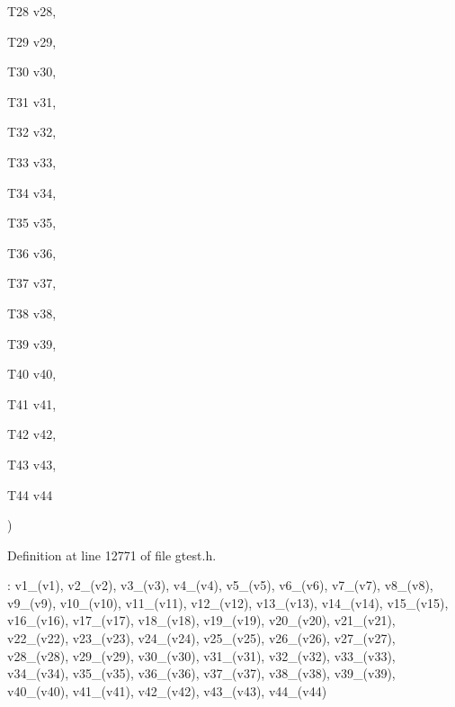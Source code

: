 {{\begin{DoxyParamCaption}
\item[{\-T28}]{v28, }
\item[{\-T29}]{v29, }
\item[{\-T30}]{v30, }
\item[{\-T31}]{v31, }
\item[{\-T32}]{v32, }
\item[{\-T33}]{v33, }
\item[{\-T34}]{v34, }
\item[{\-T35}]{v35, }
\item[{\-T36}]{v36, }
\item[{\-T37}]{v37, }
\item[{\-T38}]{v38, }
\item[{\-T39}]{v39, }
\item[{\-T40}]{v40, }
\item[{\-T41}]{v41, }
\item[{\-T42}]{v42, }
\item[{\-T43}]{v43, }
\item[{\-T44}]{v44}
\end{DoxyParamCaption}
)}}\label{d7/d4e/classtesting_1_1internal_1_1ValueArray44_a78dbdfa2b4a2b9ee95b02f7a9396f8b0}


\-Definition at line 12771 of file gtest.\-h.


\begin{DoxyCode}
                                 : v1_(v1), v2_(v2), v3_(v3), v4_(v4), v5_(v5),
      v6_(v6), v7_(v7), v8_(v8), v9_(v9), v10_(v10), v11_(v11), v12_(v12),
      v13_(v13), v14_(v14), v15_(v15), v16_(v16), v17_(v17), v18_(v18),
      v19_(v19), v20_(v20), v21_(v21), v22_(v22), v23_(v23), v24_(v24),
      v25_(v25), v26_(v26), v27_(v27), v28_(v28), v29_(v29), v30_(v30),
      v31_(v31), v32_(v32), v33_(v33), v34_(v34), v35_(v35), v36_(v36),
      v37_(v37), v38_(v38), v39_(v39), v40_(v40), v41_(v41), v42_(v42),
      v43_(v43), v44_(v44) {}
\end{DoxyCode}


